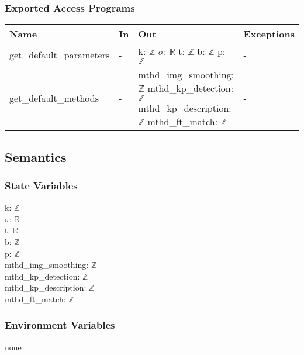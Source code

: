 \documentclass[12pt, titlepage]{article}
\begin{document}
\subsubsection{Exported Access Programs}

\begin{center}
\begin{tabular}{p{4cm} p{3.5cm} p{4.5cm} p{3.5cm}}
\hline
\textbf{Name} & \textbf{In} & \textbf{Out} & \textbf{Exceptions} \\
\hline
get\_default\_parameters & - & 
k: $\mathbb{Z}$ \newline 
$\sigma$: $\mathbb{R}$ \newline 
t: $\mathbb{Z}$ \newline 
b: $\mathbb{Z}$ \newline 
p: $\mathbb{Z}$ 
& - \\
\hline
get\_default\_methods & - & 
mthd\_img\_smoothing: $\mathbb{Z}$ \newline 
mthd\_kp\_detection: $\mathbb{Z}$ \newline 
mthd\_kp\_description: $\mathbb{Z}$ \newline 
mthd\_ft\_match: $\mathbb{Z}$ & - \\
\hline
\end{tabular}
\end{center}

\subsection{Semantics}

\subsubsection{State Variables}

k: $\mathbb{Z}$ \\
$\sigma$: $\mathbb{R}$ \\
t: $\mathbb{R}$ \\
b: $\mathbb{Z}$ \\
p: $\mathbb{Z}$ \\
mthd\_img\_smoothing: $\mathbb{Z}$ \\
mthd\_kp\_detection: $\mathbb{Z}$ \\
mthd\_kp\_description: $\mathbb{Z}$ \\
mthd\_ft\_match: $\mathbb{Z}$ \\

\subsubsection{Environment Variables}
none 
\end{document}
